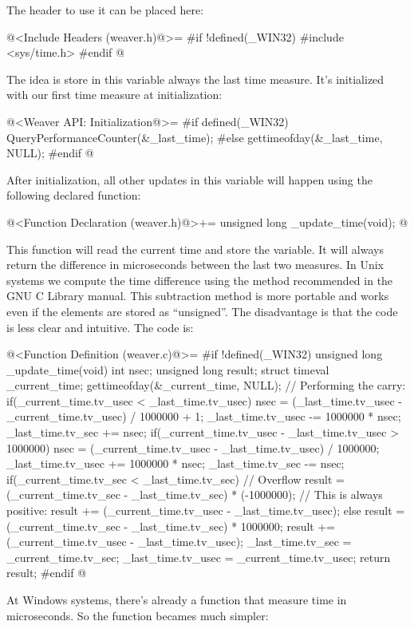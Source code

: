 The header to use it can be placed here:

\iniciocodigo
@<Include Headers (weaver.h)@>=
#if !defined(_WIN32)
#include <sys/time.h>
#endif
@
\fimcodigo

The idea is store in this variable always the last time measure. It's
initialized with our first time measure at initialization:

\iniciocodigo
@<Weaver API: Initialization@>=
#if defined(_WIN32)
QueryPerformanceCounter(&_last_time);
#else
gettimeofday(&_last_time, NULL);
#endif
@
\fimcodigo

After initialization, all other updates in this variable will happen
using the following declared function:

\iniciocodigo
@<Function Declaration (weaver.h)@>+=
unsigned long _update_time(void);
@
\fimcodigo

This function will read the current time and store the variable. It
will always return the difference in microseconds between the last two
measures. In Unix systems we compute the time difference using the
method recommended in the GNU C Library manual. This subtraction
method is more portable and works even if the 
elements are stored as ``unsigned''. The disadvantage is that the code
is less clear and intuitive. The code is:


\iniciocodigo
@<Function Definition (weaver.c)@>=
#if !defined(_WIN32)
unsigned long _update_time(void){
  int nsec;
  unsigned long result;
  struct timeval _current_time;
  gettimeofday(&_current_time, NULL);
  // Performing the carry:
  if(_current_time.tv_usec < _last_time.tv_usec){
    nsec = (_last_time.tv_usec - _current_time.tv_usec) / 1000000 + 1;
    _last_time.tv_usec -= 1000000 * nsec;
    _last_time.tv_sec += nsec;
  }
  if(_current_time.tv_usec - _last_time.tv_usec > 1000000){
    nsec = (_current_time.tv_usec - _last_time.tv_usec) / 1000000;
    _last_time.tv_usec += 1000000 * nsec;
    _last_time.tv_sec -= nsec;
  }
  if(_current_time.tv_sec < _last_time.tv_sec){
    // Overflow
    result = (_current_time.tv_sec - _last_time.tv_sec) * (-1000000);
    // This is always positive:
    result += (_current_time.tv_usec - _last_time.tv_usec);
  }
  else{
    result = (_current_time.tv_sec - _last_time.tv_sec) * 1000000;
    result += (_current_time.tv_usec - _last_time.tv_usec);
  }
  _last_time.tv_sec = _current_time.tv_sec;
  _last_time.tv_usec = _current_time.tv_usec;
  return result;
}
#endif
@
\fimcodigo

At Windows systems, there's already a function that measure time in
microseconds. So the function becames much simpler:

